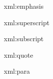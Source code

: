 

\startxmlsetups xml:emphasis
	{\em {}}
\stopxmlsetups

\startxmlsetups xml:superscript
\stopxmlsetups

\startxmlsetups xml:subscript
\stopxmlsetups

\startxmlsetups xml:quote
\stopxmlsetups

\startxmlsetups xml:para
	\par
\stopxmlsetups

